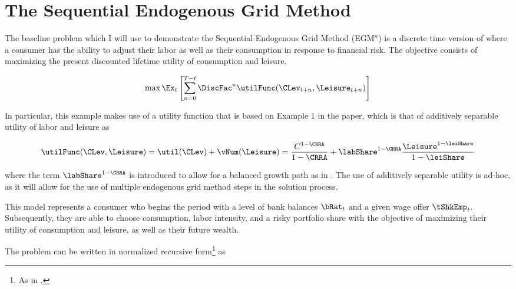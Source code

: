 \documentclass[\econtexRoot/SequentialEGM]{subfiles}
\begin{document}
\hypertarget{method}{}
\par\section{The Sequential Endogenous Grid Method}
\notinsubfile{\label{sec:method}}


The baseline problem which I will use to demonstrate the Sequential Endogenous Grid Method (EGM$^n$) is a discrete time version of \cite{Bodie1992-yp} where a consumer has the ability to adjust their labor as well as their consumption in response to financial risk. The objective consists of maximizing the present discounted lifetime utility of consumption and leisure.

\begin{equation}
        \max \Ex_{t} \left[ \sum_{n = 0}^{T-t} \DiscFac^{n} \utilFunc(\CLev_{t+n}, \Leisure_{t+n})  \right]
\end{equation}

In particular, this example makes use of a utility function that is based on Example 1 in the paper, which is that of additively separable utility of labor and leisure as

\begin{equation}
        \utilFunc(\CLev, \Leisure) = \util(\CLev) + \vNum(\Leisure) = \frac{C^{1-\CRRA}}{1-\CRRA} + \labShare^{1-\CRRA} \frac{\Leisure^{1-\leiShare}}{1-\leiShare}
\end{equation}

where the term $\labShare^{1-\CRRA}$ is introduced to allow for a balanced growth path as in \cite{Mertens2011-ap}. The use of additively separable utility is ad-hoc, as it will allow for the use of multiple endogenous grid method steps in the solution process.

This model represents a consumer who begins the period with a level of bank balances $\bRat_{t}$ and a given wage offer $\tShkEmp_{t}$. Subsequently, they are able to choose consumption, labor intensity, and a risky portfolio share with the objective of maximizing their utility of consumption and leisure, as well as their future wealth.

The problem can be written in normalized recursive form\footnote{As in \cite{Carroll2009-zq}.} as
\end{document}
